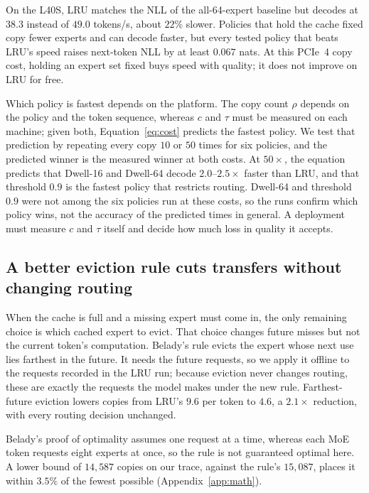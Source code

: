 \documentclass{article}
\newcommand{\xf}{\ensuremath{\rho}}
\begin{document}
On the L40S, LRU matches the NLL of the all-64-expert baseline but decodes at
$38.3$ instead of $49.0$ tokens/s, about $22\%$ slower. Policies that hold the
cache fixed copy fewer experts and can decode faster, but every tested policy
that beats LRU's speed raises next-token NLL by at least $0.067$ nats. At this
PCIe~4 copy cost, holding an expert set fixed buys speed with quality; it does
not improve on LRU for free.

Which policy is fastest depends on the platform. The copy count $\xf$ depends
on the policy and the token sequence, whereas $c$ and $\tau$ must be measured
on each machine; given both, Equation~\eqref{eq:cost} predicts the fastest
policy. We test that prediction by repeating every copy $10$ or $50$ times for
six policies, and the predicted winner is the measured winner at both costs.
At $50\times$, the equation predicts that Dwell-16 and Dwell-64 decode
$2.0$--$2.5\times$ faster than LRU, and that threshold $0.9$ is the fastest
policy that restricts routing. Dwell-64 and threshold $0.9$ were not among the
six policies run at these costs, so the runs confirm which policy wins, not
the accuracy of the predicted times in general. A deployment must measure $c$
and $\tau$ itself and decide how much loss in quality it accepts.

\vspace{-3pt}

\subsection{A better eviction rule cuts transfers without changing routing}

\label{sec:belady}

\vspace{-2pt}

When the cache is full and a missing expert must come in, the only remaining
choice is which cached expert to evict. That choice changes future misses but
not the current token's computation. Belady's rule \citep{belady1966study}
evicts the expert whose next use lies farthest in the future. It needs the
future requests, so we apply it offline to the requests recorded in the LRU
run; because eviction never changes routing, these are exactly the requests
the model makes under the new rule. Farthest-future eviction lowers copies from
LRU's $9.6$ per token to $4.6$, a $2.1\times$ reduction, with every routing
decision unchanged.

Belady's proof of optimality assumes one request at a time, whereas each MoE
token requests eight experts at once, so the rule is not guaranteed optimal
here. A lower bound of $14{,}587$ copies on our trace, against the rule's
$15{,}087$, places it within $3.5\%$ of the fewest possible
(Appendix~\ref{app:math}).
\end{document}
